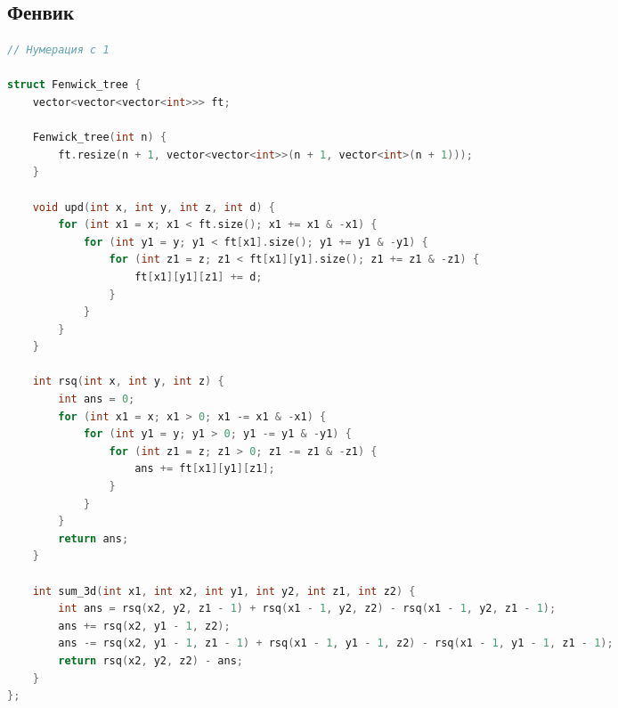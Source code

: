 \documentclass[10pt,a4paper,landscape,twosided]{extarticle}
\begin{document}
\begin{multicols}{3}
\begin{lstlisting}[language=C++]
\end{lstlisting}

\subsection{Фенвик}
\begin{lstlisting}[language=C++]
// Нумерация с 1

struct Fenwick_tree {
    vector<vector<vector<int>>> ft;

    Fenwick_tree(int n) {
        ft.resize(n + 1, vector<vector<int>>(n + 1, vector<int>(n + 1)));
    }

    void upd(int x, int y, int z, int d) {
        for (int x1 = x; x1 < ft.size(); x1 += x1 & -x1) {
            for (int y1 = y; y1 < ft[x1].size(); y1 += y1 & -y1) {
                for (int z1 = z; z1 < ft[x1][y1].size(); z1 += z1 & -z1) {
                    ft[x1][y1][z1] += d;
                }
            }
        }
    }

    int rsq(int x, int y, int z) {
        int ans = 0;
        for (int x1 = x; x1 > 0; x1 -= x1 & -x1) {
            for (int y1 = y; y1 > 0; y1 -= y1 & -y1) {
                for (int z1 = z; z1 > 0; z1 -= z1 & -z1) {
                    ans += ft[x1][y1][z1];
                }
            }
        }
        return ans;
    }

    int sum_3d(int x1, int x2, int y1, int y2, int z1, int z2) {
        int ans = rsq(x2, y2, z1 - 1) + rsq(x1 - 1, y2, z2) - rsq(x1 - 1, y2, z1 - 1);
        ans += rsq(x2, y1 - 1, z2);
        ans -= rsq(x2, y1 - 1, z1 - 1) + rsq(x1 - 1, y1 - 1, z2) - rsq(x1 - 1, y1 - 1, z1 - 1);
        return rsq(x2, y2, z2) - ans;
    }
};

\end{lstlisting}
\end{multicols}
\end{document}
